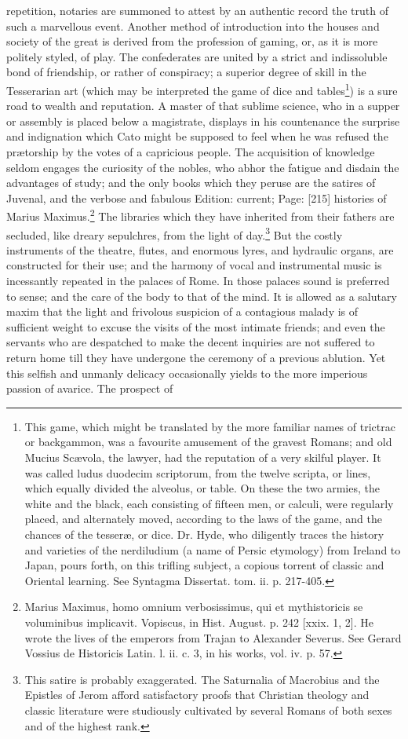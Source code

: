 {repetition, notaries are summoned to attest by an authentic record the truth of such a marvellous event. Another method of introduction into the houses and society of the great is derived from the profession of gaming, or, as it is more politely styled, of play. The confederates are united by a strict and indissoluble bond of friendship, or rather of conspiracy; a superior degree of skill in the Tesserarian art (which may be interpreted the game of dice and tables\footnote{This game, which might be translated by the more familiar names of trictrac or backgammon, was a favourite amusement of the gravest Romans; and old Mucius Scævola, the lawyer, had the reputation of a very skilful player. It was called ludus duodecim scriptorum, from the twelve scripta, or lines, which equally divided the alveolus, or table. On these the two armies, the white and the black, each consisting of fifteen men, or calculi, were regularly placed, and alternately moved, according to the laws of the game, and the chances of the tesseræ, or dice. Dr. Hyde, who diligently traces the history and varieties of the nerdiludium (a name of Persic etymology) from Ireland to Japan, pours forth, on this trifling subject, a copious torrent of classic and Oriental learning. See Syntagma Dissertat. tom. ii. p. 217-405.}) is a sure road to wealth and reputation. A master of that sublime science, who in a supper or assembly is placed below a magistrate, displays in his countenance the surprise and indignation which Cato might be supposed to feel when he was refused the prætorship by the votes of a capricious people. The acquisition of knowledge seldom engages the curiosity of the nobles, who abhor the fatigue and disdain the advantages of study; and the only books which they peruse are the satires of Juvenal, and the verbose and fabulous Edition: current; Page: [215] histories of Marius Maximus.\footnote{Marius Maximus, homo omnium verbosissimus, qui et mythistoricis se voluminibus implicavit. Vopiscus, in Hist. August. p. 242 [xxix. 1, 2]. He wrote the lives of the emperors from Trajan to Alexander Severus. See Gerard Vossius de Historicis Latin. l. ii. c. 3, in his works, vol. iv. p. 57.} The libraries which they have inherited from their fathers are secluded, like dreary sepulchres, from the light of day.\footnote{This satire is probably exaggerated. The Saturnalia of Macrobius and the Epistles of Jerom afford satisfactory proofs that Christian theology and classic literature were studiously cultivated by several Romans of both sexes and of the highest rank.} But the costly instruments of the theatre, flutes, and enormous lyres, and hydraulic organs, are constructed for their use; and the harmony of vocal and instrumental music is incessantly repeated in the palaces of Rome. In those palaces sound is preferred to sense; and the care of the body to that of the mind. It is allowed as a salutary maxim that the light and frivolous suspicion of a contagious malady is of sufficient weight to excuse the visits of the most intimate friends; and even the servants who are despatched to make the decent inquiries are not suffered to return home till they have undergone the ceremony of a previous ablution. Yet this selfish and unmanly delicacy occasionally yields to the more imperious passion of avarice. The prospect of }
